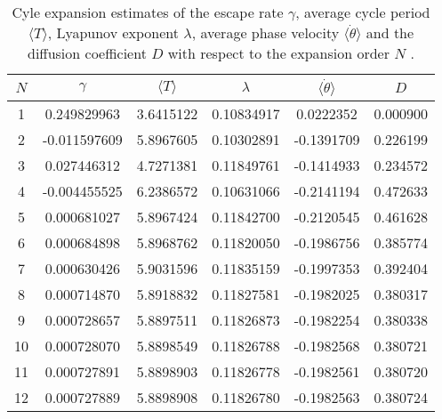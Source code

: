 \begin{table}
	\begin{tabular}{c|c|c|c|c|c}
	 $N$ & $\gamma$ & $\langle T \rangle$ & $\lambda$ & $\langle \dot{\theta} \rangle$ & $D$ \\ 
	\hline
	1 & 0.249829963 & 3.6415122 & 0.10834917 & 0.0222352 & 0.000900 \\ 
 	2 & -0.011597609 & 5.8967605 & 0.10302891 & -0.1391709 & 0.226199 \\ 
 	3 & 0.027446312 & 4.7271381 & 0.11849761 & -0.1414933 & 0.234572 \\ 
 	4 & -0.004455525 & 6.2386572 & 0.10631066 & -0.2141194 & 0.472633 \\ 
 	5 & 0.000681027 & 5.8967424 & 0.11842700 & -0.2120545 & 0.461628 \\ 
 	6 & 0.000684898 & 5.8968762 & 0.11820050 & -0.1986756 & 0.385774 \\ 
 	7 & 0.000630426 & 5.9031596 & 0.11835159 & -0.1997353 & 0.392404 \\ 
 	8 & 0.000714870 & 5.8918832 & 0.11827581 & -0.1982025 & 0.380317 \\ 
 	9 & 0.000728657 & 5.8897511 & 0.11826873 & -0.1982254 & 0.380338 \\ 
 	10 & 0.000728070 & 5.8898549 & 0.11826788 & -0.1982568 & 0.380721 \\ 
 	11 & 0.000727891 & 5.8898903 & 0.11826778 & -0.1982561 & 0.380720 \\ 
 	12 & 0.000727889 & 5.8898908 & 0.11826780 & -0.1982563 & 0.380724 \\ 
 	\end{tabular}
	\caption{Cyle expansion estimates 
             of the escape rate $\gamma$, average cycle period $\langle T \rangle$, 
             Lyapunov exponent $\lambda$, average phase velocity 
             $\langle \dot{\theta} \rangle$ and the diffusion coefficient $D$ 
             with respect to the expansion order $N$ .}
	\label{t-DynamicalAverages}
\end{table}
